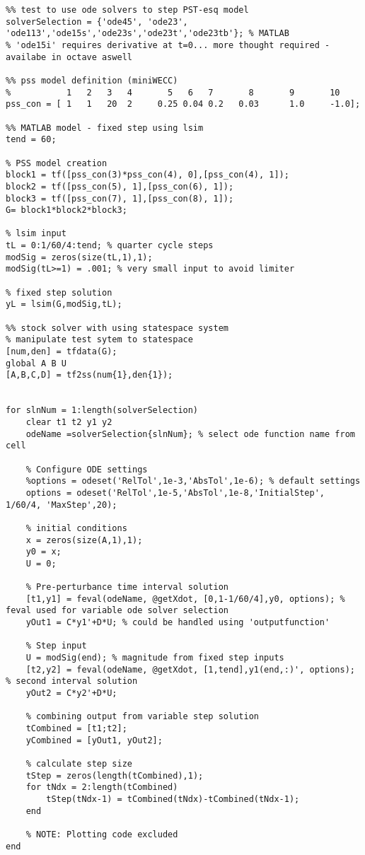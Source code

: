 \documentclass[12pt]{article}
\begin{document}
\begin{verbatim}
%% test to use ode solvers to step PST-esq model
solverSelection = {'ode45', 'ode23', 'ode113','ode15s','ode23s','ode23t','ode23tb'}; % MATLAB
% 'ode15i' requires derivative at t=0... more thought required - availabe in octave aswell

%% pss model definition (miniWECC)
%           1   2   3   4       5   6   7       8       9       10
pss_con = [ 1  	1   20  2     0.25 0.04 0.2   0.03      1.0     -1.0];

%% MATLAB model - fixed step using lsim
tend = 60;

% PSS model creation
block1 = tf([pss_con(3)*pss_con(4), 0],[pss_con(4), 1]);
block2 = tf([pss_con(5), 1],[pss_con(6), 1]);
block3 = tf([pss_con(7), 1],[pss_con(8), 1]);
G= block1*block2*block3;

% lsim input
tL = 0:1/60/4:tend; % quarter cycle steps
modSig = zeros(size(tL,1),1);
modSig(tL>=1) = .001; % very small input to avoid limiter

% fixed step solution
yL = lsim(G,modSig,tL);

%% stock solver with using statespace system
% manipulate test sytem to statespace
[num,den] = tfdata(G);
global A B U
[A,B,C,D] = tf2ss(num{1},den{1});
    
    
for slnNum = 1:length(solverSelection)
    clear t1 t2 y1 y2
    odeName =solverSelection{slnNum}; % select ode function name from cell
    
    % Configure ODE settings
    %options = odeset('RelTol',1e-3,'AbsTol',1e-6); % default settings
    options = odeset('RelTol',1e-5,'AbsTol',1e-8,'InitialStep', 1/60/4, 'MaxStep',20);
    
    % initial conditions
    x = zeros(size(A,1),1);
    y0 = x;
    U = 0;
    
    % Pre-perturbance time interval solution
    [t1,y1] = feval(odeName, @getXdot, [0,1-1/60/4],y0, options); % feval used for variable ode solver selection
    yOut1 = C*y1'+D*U; % could be handled using 'outputfunction'
    
    % Step input
    U = modSig(end); % magnitude from fixed step inputs
    [t2,y2] = feval(odeName, @getXdot, [1,tend],y1(end,:)', options); % second interval solution
    yOut2 = C*y2'+D*U;
    
    % combining output from variable step solution
    tCombined = [t1;t2];
    yCombined = [yOut1, yOut2];
    
    % calculate step size
    tStep = zeros(length(tCombined),1);
    for tNdx = 2:length(tCombined)
        tStep(tNdx-1) = tCombined(tNdx)-tCombined(tNdx-1);
    end  
    
    % NOTE: Plotting code excluded
end
\end{verbatim}
\end{document}
